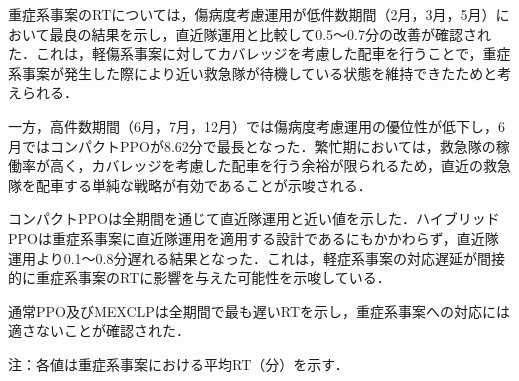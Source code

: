 重症系事案のRTについては，傷病度考慮運用が低件数期間（2月，3月，5月）において最良の結果を示し，直近隊運用と比較して0.5～0.7分の改善が確認された．これは，軽傷系事案に対してカバレッジを考慮した配車を行うことで，重症系事案が発生した際により近い救急隊が待機している状態を維持できたためと考えられる．

一方，高件数期間（6月，7月，12月）では傷病度考慮運用の優位性が低下し，6月ではコンパクトPPOが8.62分で最長となった．繁忙期においては，救急隊の稼働率が高く，カバレッジを考慮した配車を行う余裕が限られるため，直近の救急隊を配車する単純な戦略が有効であることが示唆される．

コンパクトPPOは全期間を通じて直近隊運用と近い値を示した．ハイブリッドPPOは重症系事案に直近隊運用を適用する設計であるにもかかわらず，直近隊運用より0.1～0.8分遅れる結果となった．これは，軽症系事案の対応遅延が間接的に重症系事案のRTに影響を与えた可能性を示唆している．

通常PPO及びMEXCLPは全期間で最も遅いRTを示し，重症系事案への対応には適さないことが確認された．

\begin{table}
    \centering
    \caption{各テスト期間における配車手法別の重症RT（分）}
    \label{tab:重症系事案のRT}
    \footnotesize
    \begin{flushleft}
    注：各値は重症系事案における平均RT（分）を示す．
    \end{flushleft}
\end{table}
\clearpage

